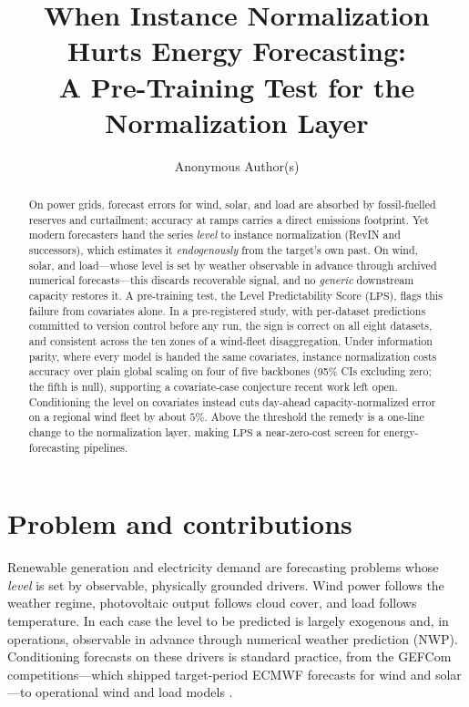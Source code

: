 \documentclass{article}
\title{When Instance Normalization Hurts Energy Forecasting:\\
A Pre-Training Test for the Normalization Layer}
\author{Anonymous Author(s)}
\newcommand{\lps}{\ensuremath{\mathrm{LPS}}}
\begin{document}
\maketitle

\begin{abstract}
On power grids, forecast errors for wind, solar, and load are absorbed by
fossil-fuelled reserves and curtailment; accuracy at ramps carries a direct
emissions footprint. Yet modern forecasters hand
the series \emph{level} to instance normalization (RevIN and successors), which
estimates it \emph{endogenously} from the target's own past. On wind, solar, and
load---whose level is set by weather observable in advance through archived
numerical forecasts---this discards recoverable signal, and no \emph{generic}
downstream capacity restores it. A pre-training test, the Level Predictability
Score (\lps), flags this failure from covariates alone.
In a pre-registered study, with per-dataset predictions committed to
version control before any run, the sign is correct on all eight datasets, and
consistent across the ten zones of a wind-fleet disaggregation. Under information
parity, where every model is handed the same covariates, instance normalization
costs accuracy over plain global scaling on four of five backbones (95\% CIs
excluding zero; the fifth is null), supporting a covariate-case conjecture
recent work left open. Conditioning the level on covariates instead cuts
day-ahead capacity-normalized error on a regional wind fleet by about $5\%$.
Above
the threshold the remedy is a one-line change to the normalization layer, making
\lps{} a near-zero-cost screen for energy-forecasting pipelines.
\end{abstract}

\section{Problem and contributions}

Renewable generation and electricity demand are forecasting problems whose
\emph{level} is set by observable, physically grounded drivers.
Wind power follows the weather regime, photovoltaic output follows cloud
cover, and load follows temperature. In each case the level to be
predicted is largely exogenous and, in operations, observable in advance through
numerical weather prediction (NWP). Conditioning forecasts on these drivers is
standard practice, from the GEFCom competitions---which shipped target-period
ECMWF forecasts for wind and solar---to operational wind and load models
\citep{hong2016gefcom,pinson2013wind}.
\end{document}
